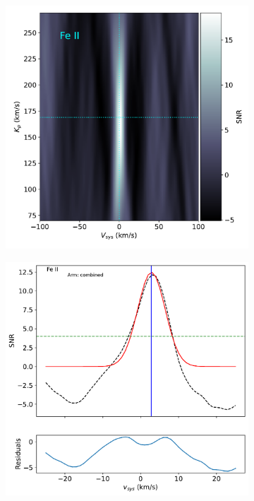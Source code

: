 \documentclass[twocolumn]{aastex631}
\begin{document}
\begin{figure}[ht!]
        \begin{subfigure}[b]{0.333\textwidth}
            \includegraphics[width=\textwidth]{plots-updated/kp-vsys-map/combined/KELT-20b.20190504.combined.Fe+.CCFs-shifted.pdf}
            \label{fig:2d-ccf-Fe+-combined}
        \end{subfigure}
        \begin{subfigure}[b]{0.333\textwidth}
            \includegraphics[width=\textwidth]{plots-updated/line-profile/combined/KELT-20b.20190504.combined.Fe+.SNR-Gaussian.pdf}

\end{subfigure}
\end{figure}
\end{document}
